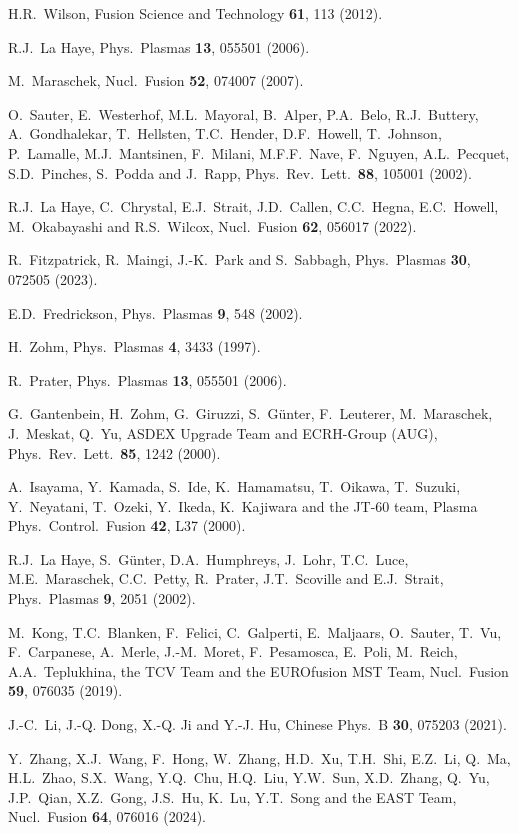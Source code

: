 \documentclass[12pt,prb,aps]{revtex4-1}
\begin{document}
\begin{thebibliography}{99}
 H.R.~Wilson, Fusion Science and Technology {\bf 61},  113 (2012). 
 
 R.J.~La Haye, Phys.\ Plasmas {\bf 13}, 055501 (2006).

 M.~Maraschek, Nucl.\ Fusion {\bf 52}, 074007 (2007). 

 O.~Sauter, E.~Westerhof, M.L.~Mayoral, B.~Alper, P.A.~Belo, R.J.~Buttery, A.~Gondhalekar, T.~Hellsten, T.C.~Hender, 
D.F.~Howell, T.~Johnson, P.~Lamalle, M.J.~Mantsinen, F.~Milani, M.F.F.~Nave, F.~Nguyen, A.L.~Pecquet, S.D.~Pinches, S.~Podda and J.~Rapp,
Phys.\ Rev.\ Lett.\ {\bf 88}, 105001 (2002).

 R.J.~La Haye, C.~Chrystal, E.J.~Strait, J.D.~Callen, C.C.~Hegna, E.C.~Howell, M.~Okabayashi and R.S.~Wilcox, Nucl.\ Fusion {\bf 62}, 056017 (2022).

  R.~Fitzpatrick, R.~Maingi, J.-K.~Park and S.~Sabbagh, Phys.\ Plasmas {\bf 30}, 072505 (2023).

 E.D.~Fredrickson, Phys.\ Plasmas {\bf 9}, 548 (2002).

 H.~Zohm, Phys.\ Plasmas {\bf 4}, 3433 (1997). 

 R.~Prater, Phys.\ Plasmas {\bf 13}, 055501 (2006).

 G.~Gantenbein, H.~Zohm, G.~Giruzzi, S.~G\"{u}nter, F.~Leuterer, M.~Maraschek, J.~Meskat, Q.~Yu,  ASDEX Upgrade Team and ECRH-Group (AUG), 
Phys.\ Rev.\ Lett.\ {\bf 85}, 1242 (2000). 

 A.~Isayama, Y.~Kamada, S.~Ide, K.~Hamamatsu, T.~Oikawa, T.~Suzuki, Y.~Neyatani, T.~Ozeki, Y.~Ikeda, K.~Kajiwara and the JT-60 team,  
Plasma Phys.\  Control.\ Fusion {\bf 42}, L37 (2000).

 R.J.~La Haye,  S.~G\"{u}nter,  D.A.~Humphreys,  J.~Lohr,  T.C.~Luce,  M.E.~Maraschek,  C.C.~Petty, R.~Prater,  J.T.~Scoville and E.J.~Strait,
 Phys.\ Plasmas {\bf 9}, 2051 (2002).
 
  M.~Kong, T.C.~Blanken, F.~Felici, C.~Galperti, E.~Maljaars,
O.~Sauter, T.~Vu, F.~Carpanese, A.~Merle, J.-M.~Moret, F.~Pesamosca, E.~Poli, M.~Reich, A.A.~Teplukhina, the TCV Team and the EUROfusion MST Team,
Nucl.\ Fusion {\bf 59}, 076035 (2019).

 J.-C.~Li, J.-Q. Dong, X.-Q. Ji and Y.-J. Hu,  Chinese Phys.\ B {\bf 30}, 075203 (2021).

 Y.~Zhang, X.J.~Wang, F.~Hong, W.~Zhang, H.D.~Xu, T.H.~Shi, E.Z.~Li, Q.~Ma, H.L.~Zhao, S.X.~Wang, Y.Q.~Chu, H.Q.~Liu, Y.W.~Sun, 
X.D.~Zhang, Q.~Yu, J.P.~Qian, X.Z.~Gong, J.S.~Hu, K.~Lu, Y.T.~Song and the EAST Team, 
 Nucl.\ Fusion {\bf 64},  076016 (2024).


\end{thebibliography}
\end{document}
